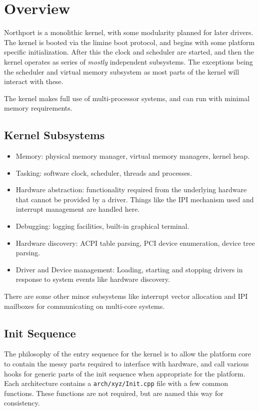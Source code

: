 \section{Overview}
Northport is a monolithic kernel, with some modularity planned for later drivers. The kernel is booted via the limine boot protocol, and begins with some platform specific initialization. After this the clock and scheduler are started, and then the kernel operates as series of \textit{mostly} independent subsystems. The exceptions being the scheduler and virtual memory subsystem as most parts of the kernel will interact with these.

The kernel makes full use of multi-processor systems, and can run with minimal memory requirements.

\subsection{Kernel Subsystems}
\begin{itemize}
    \item Memory: physical memory manager, virtual memory managers, kernel heap.
    \item Tasking: software clock, scheduler, threads and processes.
    \item Hardware abstraction: functionality required from the underlying hardware that cannot be provided by a driver. Things like the IPI mechanism used and interrupt management are handled here.
    \item Debugging: logging facilities, built-in graphical terminal.
    \item Hardware discovery: ACPI table parsing, PCI device enumeration, device tree parsing.
    \item Driver and Device management: Loading, starting and stopping drivers in response to system events like hardware discovery.
\end{itemize}

There are some other minor subsystems like interrupt vector allocation and IPI mailboxes for communicating on multi-core systems.

\subsection{Init Sequence}
The philosophy of the entry sequence for the kernel is to allow the platform core to contain the messy parts required to interface with hardware, and call various hooks for generic parts of the init sequence when appropriate for the platform. Each architecture contains a \verb|arch/xyz/Init.cpp| file with a few common functions. These functions are not required, but are named this way for consistency.

